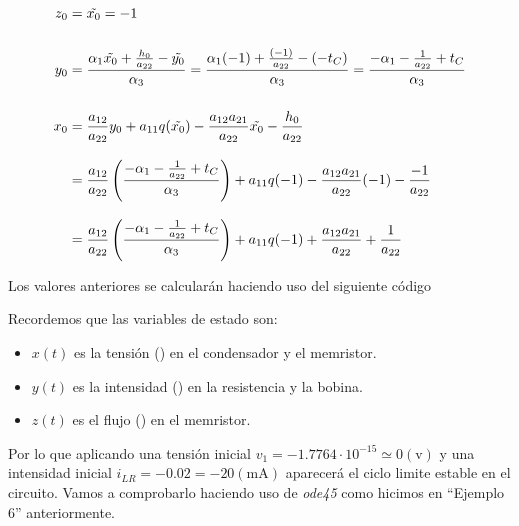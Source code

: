 \documentclass[12pt,a4paper]{report} %
\begin{document}
\begin{subequations}
	\label{eq:deshh}
	\begin{align}
		z_0&=\tilde{x_0}=-1 \label{eq:desh3} \\[5mm]
		y_0&= \frac{\alpha_1\tilde{x_0}+\frac{h_0}{a_{22}}-\tilde{y_0}}{\alpha_3} = \frac{\alpha_1(-1)+\frac{(-1)}{a_{22}}-(-t_C)}{\alpha_3} = \frac{-\alpha_1-\frac{1}{a_{22}}+t_C}{\alpha_3} \label{eq:desh4} \\[5mm]
		x_0&=\frac{a_{12}}{a_{22}}y_0+a_{11}q(\tilde{x_0})-\frac{a_{12}a_{21}}{a_{22}}\tilde{x_0}-\frac{h_0}{a_{22}}\notag\\[3mm] &=\frac{a_{12}}{a_{22}}  \left( \frac{-\alpha_1-\frac{1}{a_{22}}+t_C}{\alpha_3} \right)+a_{11}q(-1)-\frac{a_{12}a_{21}}{a_{22}}(-1)-\frac{-1}{a_{22}}\notag\\[3mm]
		&=\frac{a_{12}}{a_{22}}  \left( \frac{-\alpha_1-\frac{1}{a_{22}}+t_C}{\alpha_3} \right)+a_{11}q(-1)+\frac{a_{12}a_{21}}{a_{22}}+\frac{1}{a_{22}} \label{eq:desh5}
	\end{align}
\end{subequations}

\newpage

	\noindent Los valores anteriores se calcularán haciendo uso del siguiente código
	
	\vspace{0.5cm}
	
	\vspace{1cm}
	
	\newpage
	
	\noindent Recordemos que las variables de estado son:
	
	\begin{itemize}
		\item $x(t)$ es la tensión () en el condensador y el memristor.
		\item $y(t)$ es la intensidad () en la resistencia y la bobina.
		\item $z(t)$ es el flujo (\bm{$\varphi$}) en el memristor.
	\end{itemize}
	
	\vspace{0.5cm}\noindent Por lo que aplicando una tensión inicial $v_1=-1.7764\cdotp 10^{-15} \simeq 0 (\text{v})$ y una intensidad inicial $i_{LR}=-0.02=-20(\text{mA})$ aparecerá el ciclo limite estable en el circuito. Vamos a comprobarlo haciendo uso de \textit{ode45} como hicimos en ``Ejemplo 6'' anteriormente.
	
\end{document}
